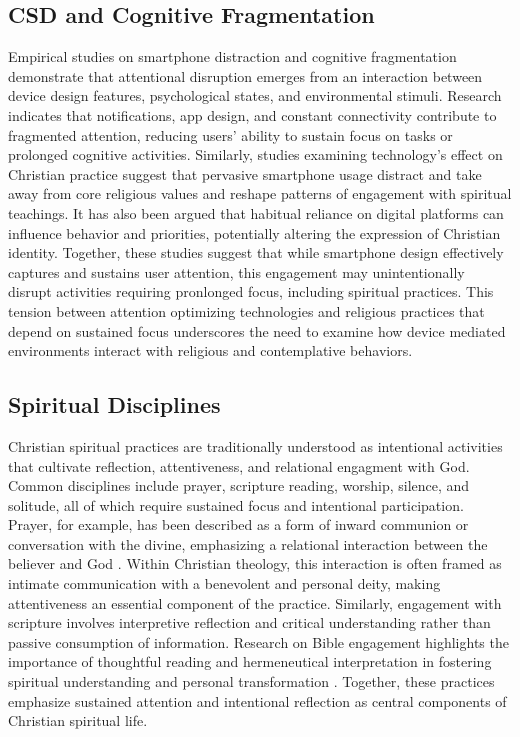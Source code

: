 \documentclass[12pt]{article}
\begin{document}
\subsection{CSD and Cognitive Fragmentation}
Empirical studies on smartphone distraction and cognitive fragmentation demonstrate that attentional disruption emerges from an interaction between device design features, psychological states, and environmental stimuli\cite{10.1016/j.ijinfomgt.2023.102722}. Research indicates that notifications, app design, and constant connectivity contribute to fragmented attention, reducing users' ability to sustain focus on tasks or prolonged cognitive activities. Similarly, studies examining technology's effect on Christian practice suggest that pervasive smartphone usage distract and take away from core religious values and reshape patterns of engagement with spiritual teachings. It has also been argued that habitual reliance on digital platforms can influence behavior and priorities, potentially altering the expression of Christian identity\cite{sims2001effect}. Together, these studies suggest that while smartphone design effectively captures and sustains user attention, this engagement may unintentionally disrupt activities requiring pronlonged focus, including spiritual practices. This tension between attention optimizing technologies and religious practices that depend on sustained focus underscores the need to examine how device mediated environments interact with religious and contemplative behaviors.
\subsection{Spiritual Disciplines}
Christian spiritual practices are traditionally understood as intentional activities that cultivate reflection, attentiveness, and relational engagment with God. Common disciplines include prayer, scripture reading, worship, silence, and solitude, all of which require sustained focus and intentional participation. Prayer, for example, has been described as a form of inward communion or conversation with the divine, emphasizing a relational interaction between the believer and God \cite{finney1985empirical}. Within Christian theology, this interaction is often framed as intimate communication with a benevolent and personal deity, making attentiveness an essential component of the practice. Similarly, engagement with scripture involves interpretive reflection and critical understanding rather than passive consumption of information. Research on Bible engagement highlights the importance of thoughtful reading and hermeneutical interpretation in fostering spiritual understanding and personal transformation \cite{roche2020facilitating}. Together, these practices emphasize sustained attention and intentional reflection as central components of Christian spiritual life.
\end{document}
